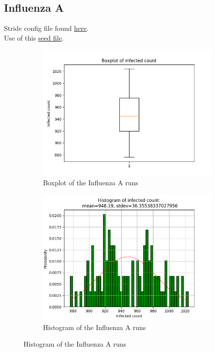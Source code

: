 \documentclass[a4paper]{article}
\begin{document}
\subsection{Influenza A}
Stride config file found \href{https://github.com/RobbeHeirman/Configs/blob/master/config/run_random-geopop_nolog-influAtest.xml}{here}.\\
Use of this \href{https://github.com/RobbeHeirman/Configs/blob/master/100-random.txt}{seed file}.
\\

\begin{figure}[H]
\centering
\begin{subfigure}{.5\textwidth}
  \centering
  \includegraphics[width=1\linewidth]{Influenza_A/Influenza_A-boxplot.png}
  \caption{Boxplot of the Influenza A runs}
  \label{fig:Boxplot_Influenza_A}
\end{subfigure}%
\begin{subfigure}{.5\textwidth}
  \centering
  \includegraphics[width=1\linewidth]{Influenza_A/Influenza_A-histogram.png}
  \caption{Histogram of the Influenza A runs}
  \label{fig:Histogram_Influenza_A}
\end{subfigure}


\end{figure}
\end{document}
